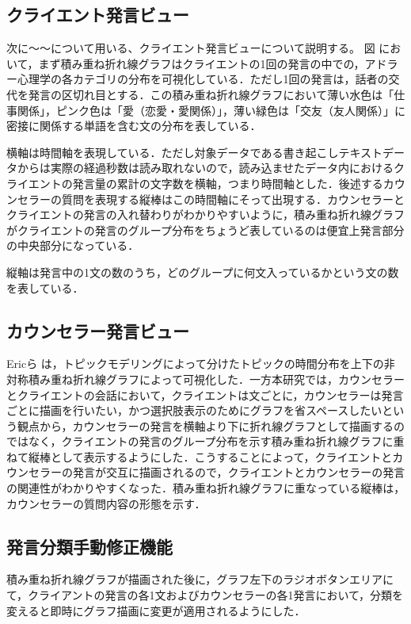 \documentclass[shuuron]{kuee}
\begin{document}
\subsection{クライエント発言ビュー}
次に〜〜について用いる、クライエント発言ビューについて説明する。
図
において，まず積み重ね折れ線グラフはクライエントの1回の発言の中での，アドラー心理学の各カテゴリの分布を可視化している．ただし1回の発言は，話者の交代を発言の区切れ目とする．この積み重ね折れ線グラフにおいて薄い水色は「仕事関係」，ピンク色は「愛（恋愛・愛関係）」，薄い緑色は「交友（友人関係）」に密接に関係する単語を含む文の分布を表している．

横軸は時間軸を表現している．ただし対象データである書き起こしテキストデータからは実際の経過秒数は読み取れないので，読み込ませたデータ内におけるクライエントの発言量の累計の文字数を横軸，つまり時間軸とした．後述するカウンセラーの質問を表現する縦棒はこの時間軸にそって出現する．カウンセラーとクライエントの発言の入れ替わりがわかりやすいように，積み重ね折れ線グラフがクライエントの発言のグループ分布をちょうど表しているのは便宜上発言部分の中央部分になっている．

縦軸は発言中の1文の数のうち，どのグループに何文入っているかという文の数を表している．





\subsection{カウンセラー発言ビュー}

Ericら
は，トピックモデリングによって分けたトピックの時間分布を上下の非対称積み重ね折れ線グラフによって可視化した．一方本研究では，カウンセラーとクライエントの会話において，クライエントは文ごとに，カウンセラーは発言ごとに描画を行いたい，かつ選択肢表示のためにグラフを省スペースしたいという観点から，カウンセラーの発言を横軸より下に折れ線グラフとして描画するのではなく，クライエントの発言のグループ分布を示す積み重ね折れ線グラフに重ねて縦棒として表示するようにした．こうすることによって，クライエントとカウンセラーの発言が交互に描画されるので，クライエントとカウンセラーの発言の関連性がわかりやすくなった．積み重ね折れ線グラフに重なっている縦棒は，カウンセラーの質問内容の形態を示す．


\subsection{発言分類手動修正機能}
積み重ね折れ線グラフが描画された後に，グラフ左下のラジオボタンエリアにて，クライアントの発言の各1文およびカウンセラーの各1発言において，分類を変えると即時にグラフ描画に変更が適用されるようにした．
\end{document}
